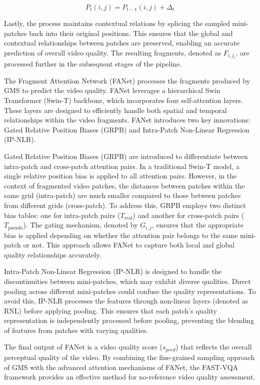 \begin{equation}
P_t(i, j) = P_{t-1}(i, j) + \Delta_t
\label{eq:temporal_alignment}
\end{equation}

Lastly, the process maintains contextual relations by splicing the sampled mini-patches back into their original positions. This ensures that the global and contextual relationships between patches are preserved, enabling an accurate prediction of overall video quality. The resulting fragments, denoted as $F_{i,j_t}$, are processed further in the subsequent stages of the pipeline.

The Fragment Attention Network (FANet) processes the fragments produced by GMS to predict the video quality. FANet leverages a hierarchical Swin Transformer (Swin-T) backbone, which incorporates four self-attention layers. These layers are designed to efficiently handle both spatial and temporal relationships within the video fragments. FANet introduces two key innovations: Gated Relative Position Biases (GRPB) and Intra-Patch Non-Linear Regression (IP-NLR).

Gated Relative Position Biases (GRPB) are introduced to differentiate between intra-patch and cross-patch attention pairs. In a traditional Swin-T model, a single relative position bias is applied to all attention pairs. However, in the context of fragmented video patches, the distances between patches within the same grid (intra-patch) are much smaller compared to those between patches from different grids (cross-patch). To address this, GRPB employs two distinct bias tables: one for intra-patch pairs (\(T_{\text{real}}\)) and another for cross-patch pairs (\(T_{\text{pseudo}}\)). The gating mechanism, denoted by \(G_{i,j}\), ensures that the appropriate bias is applied depending on whether the attention pair belongs to the same mini-patch or not. This approach allows FANet to capture both local and global quality relationships accurately.

Intra-Patch Non-Linear Regression (IP-NLR) is designed to handle the discontinuities between mini-patches, which may exhibit diverse qualities. Direct pooling across different mini-patches could confuse the quality representations. To avoid this, IP-NLR processes the features through non-linear layers (denoted as RNL) before applying pooling. This ensures that each patch's quality representation is independently processed before pooling, preventing the blending of features from patches with varying qualities.

The final output of FANet is a video quality score ($s_{pred}$) that reflects the overall perceptual quality of the video. By combining the fine-grained sampling approach of GMS with the advanced attention mechanisms of FANet, the FAST-VQA framework provides an effective method for no-reference video quality assessment.

